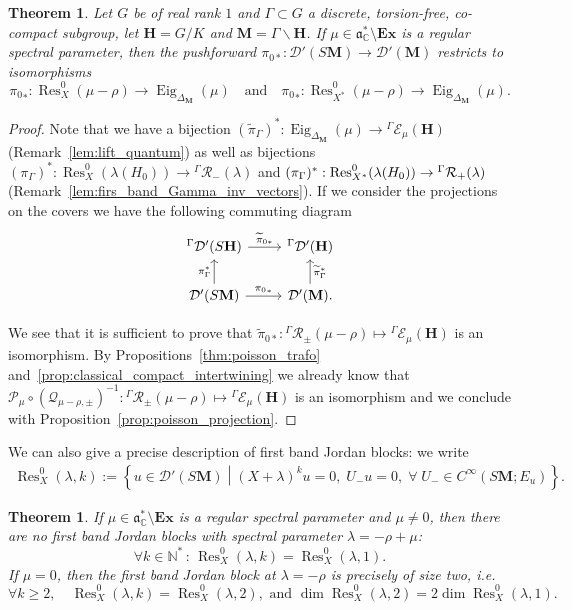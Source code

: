 \documentclass[10pt]{amsart}
\newtheorem{theo}[cdrthm]{Theorem}
\theoremstyle{definition}
\DeclareMathOperator{\Res}{Res}
\DeclareMathOperator{\Eig}{Eig}
\newcommand{\mc}{\mathcal}
\newcommand{\cc}{\mathbb{C}}
\newcommand{\bfh}{\mathbf{H}}
\newcommand{\bfm}{\mathbf{M}}
\newcommand{\til}{\widetilde}
\newcommand{\N}{\mathbb{N}}
\renewcommand{\a}{\mathfrak a}
\let\oldforall\forall
\renewcommand*{\forall}{\mathrel{\oldforall}}
\begin{document}
\begin{theo}\label{thm:intertwining}
Let $G$ be of real rank $1$ and $\Gamma\subset G$ a discrete, torsion-free, co-compact subgroup, let ${\bfh}=G/K$ and ${\bfm}=\Gamma\backslash {\bfh}$. If $\mu \in \a^*_\cc\setminus\mathbf{Ex}$ is a regular spectral parameter, then the pushforward $\pi_{0*}:\mathcal D'(S{\bfm})\to\mathcal D'({\bfm})$ restricts to isomorphisms
\begin{equation}\label{isompi0}
{\pi_0}_*:\Res^0_{X}(\mu-\rho)\to \Eig_{\Delta_{\bfm}}(\mu)
\quad
\text{and}
\quad {\pi_0}_*:\Res^0_{X^*}(\mu-\rho)\to \Eig_{\Delta_{\bfm}}(\mu).
\end{equation}
\end{theo}

\begin{proof}
Note that we have a bijection $(\til\pi_{\Gamma})^*: \Eig_{\Delta_{\bfm}}(\mu)\to{^\Gamma \mathcal E_\mu({\bfh})}$ (Remark~\ref{lem:lift_quantum}) as well as bijections $(\pi_{\Gamma})^*:\Res_{X}^0(\lambda(H_0)) \to {^\Gamma \mc{R}_-(\lambda)} $ and $(\pi_{\Gamma})^*:\Res_{X^*}^0(\lambda(H_0))\linebreak\to {^\Gamma \mc{R}_+(\lambda)}$ (Remark~\ref{lem:firs_band_Gamma_inv_vectors}). If we consider the projections on the covers we have the following commuting diagram
\[
\begin{tikzcd} ^\Gamma\mathcal D'(S{\bfh}) \arrow{r}{\til{\pi}_{0*}} & ^\Gamma\mathcal D'({\bfh}) \\
\mathcal D'(S{\bfm}) \arrow{u}{\pi_{\Gamma}^*}\arrow{r}{{\pi_0}_*} & \mathcal D'({\bfm})\arrow[swap]{u}{\til\pi_{\Gamma}^*}.
\end{tikzcd}
\]


We see that it is sufficient to prove that $\til{\pi}_{0*}: {^\Gamma \mc{R}_\pm(\mu-\rho)}\mapsto {^\Gamma \mathcal E_\mu({\bfh})}$ is an isomorphism. By Propositions~\ref{thm:poisson_trafo} and~\ref{prop:classical_compact_intertwining} we already know that $\mathcal P_\mu \circ(\mathcal Q_{\mu-\rho,\pm})^{-1}: {^\Gamma \mc{R}_\pm(\mu-\rho)}\mapsto {^\Gamma \mathcal E_\mu({\bfh})}$ is an isomorphism and we conclude with Proposition~\ref{prop:poisson_projection}.
\end{proof}


We can also give a precise description of first band Jordan blocks: we write
\begin{align*}
\Res_{X}^0(\lambda, k):= \left\{u\in \mathcal D'(S{\bfm})\middle| (X+\lambda)^ku=0,\;U_-u=0,\;\forall\;U_- \in C^\infty(S{\bfm};E_u)\right\}.
\end{align*}
\begin{theo}\label{thm:jordan}
If $\mu\in \a^*_\cc\setminus \mathbf{Ex}$ is a regular spectral parameter and $\mu \neq0$, then there are no first band Jordan blocks with spectral parameter $\lambda = -\rho+\mu$:
\[
\forall k\in \N^*\,:\,\Res_{X}^0(\lambda, k) = \Res_{X}^0(\lambda, 1).
\]
If $\mu=0$, then the first band Jordan block at $\lambda = -\rho$ is precisely of size two, i.e.
\[
\forall k\geq 2, \quad
\Res_{X}^0(\lambda, k) = \Res_{ X}^0(\lambda, 2),
\text{ and }
\dim \Res_{X}^0(\lambda, 2) =2 \dim\Res_{X}^0(\lambda, 1).
\]
\end{theo}
\end{document}
